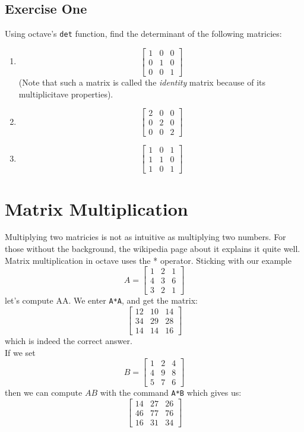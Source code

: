 \documentclass{article}
\begin{document}
\subsection{Exercise One}
Using octave's \verb|det| function, find the determinant of the following matricies:
\begin{enumerate}
\item \[
        \left[
          \begin{array}{ccc}
            1 & 0 & 0 \\
            0 & 1 & 0 \\
            0 & 0 & 1
          \end{array}
        \right]
      \]
(Note that such a matrix is called the \emph{identity} matrix because of its multiplicitave properties).
\item
\[
        \left[
          \begin{array}{ccc}
            2 & 0 & 0 \\
            0 & 2 & 0 \\
            0 & 0 & 2
          \end{array}
        \right]
      \]
\item
\[
        \left[
          \begin{array}{ccc}
            1 & 0 & 1 \\
            1 & 1 & 0 \\
            1 & 0 & 1
          \end{array}
        \right]
      \]
\end{enumerate}
\section{Matrix Multiplication}
Multiplying two matricies is not as intuitive as multiplying two numbers.  For those without the background, the wikipedia page about it explains it quite well. Matrix multiplication in octave uses the * operator.  Sticking with our example
\[A=
\left[
\begin{array}{ccc}
1 & 2 & 1 \\
4 & 3 & 6 \\
3 & 2 & 1
 \end{array}
 \right]
\]
let's compute AA.  We enter \verb|A*A|, and get the matrix:
\[
\left[
\begin{array}{ccc}
12 & 10 & 14\\
34 & 29 & 28 \\
14 & 14 & 16
 \end{array}
 \right]
\]
which is indeed the correct answer.
\\If we set
\[B=
\left[
\begin{array}{ccc}
1 & 2 & 4\\
4 & 9 & 8 \\
5 & 7 & 6
 \end{array}
 \right]
\]
then we can compute $AB$ with the command \verb|A*B|  which gives us:
\[
\left[
\begin{array}{ccc}
14 & 27 & 26\\
46 & 77 & 76 \\
16 & 31 & 34
 \end{array}
 \right]
\]
\end{document}
